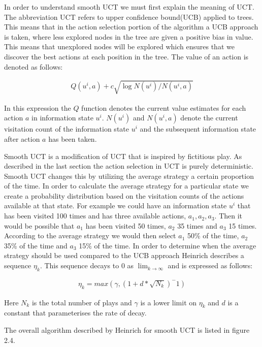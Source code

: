 In order to understand smooth UCT we must first explain the meaning of UCT.
The abbreviation UCT refers to upper confidence bound(UCB) applied to trees.
This means that in the action selection portion of the algorithm a UCB approach 
is taken, where less explored nodes in the tree are given a positive bias in value.
This means that unexplored nodes will be explored which ensures that we discover 
the best actions at each position in the tree.
The value of an action is denoted as follows:

\begin{align}
Q(u^i, a) + c \sqrt{\log N(u^i) / N(u^i, a)} 
\end{align}

In this expression the $Q$ function denotes the current value estimates for each action $a$ 
in information state $u^i$.
$N(u^i)$ and $N(u^i, a)$ denote the current visitation count of the information state $u^i$
and the subsequent information state after action $a$ has been taken.

Smooth UCT is a modification of UCT that is inspired by fictitious play\cite{heinrich2017reinforcement}.
As described in the last section the action selection in UCT is purely deterministic. 
Smooth UCT changes this by utilizing the average strategy a certain proportion 
of the time. 
In order to calculate the average strategy for a particular state we create a 
probability distribution based on the visitation counts of the actions 
available at that state.
For example we could have an information state $u^i$ that has been visited 100 times 
and has three available actions, $a_1, a_2, a_3$.
Then it would be possible that $a_1$ has been visited 50 times, $a_2$ 35 times 
and $a_3$ 15 times.
According to the average strategy we would then select $a_1$ 50\% of the time, 
$a_2$ 35\% of the time and $a_3$ 15\% of the time.
In order to determine when the average strategy should be used compared to the 
UCB approach Heinrich describes a sequence $\eta_k$. 
This sequence decays to 0 as $\lim_{k \to \infty}$ and is expressed as follows:

\begin{align}
\eta_k = max(\gamma, (1 + d * \sqrt{N_k})^-1)
\end{align}

Here $N_k$ is the total number of plays and $\gamma$ is a lower limit on $\eta_k$ 
and $d$ is a constant that parameterises the rate of decay.

The overall algorithm described by Heinrich for smooth UCT is listed in figure 2.4.


